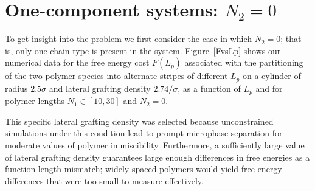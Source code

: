 \section{One-component systems: $N_2 = 0$}\label{sec:nudef}

To get insight into the problem we first consider the case in which $N_2=0$; that is, only one chain type is present in the system. Figure~\ref{FvsLp} shows our numerical data for the free energy cost  $F(L_p)$ associated with the partitioning of the two polymer species into alternate stripes of different $L_p$ on a cylinder of radius $2.5\sigma$ and lateral grafting density $2.74/\sigma$, as a function of $L_p$ and for polymer lengths $N_1 \in \left[10,30\right]$ and $N_2 = 0$.
 
 This specific lateral grafting density was selected because unconstrained simulations under this condition lead to prompt microphase separation for moderate values of polymer immiscibility. Furthermore, a sufficiently large value of lateral grafting density guarantees large enough differences in free energies as a function length mismatch; widely-spaced polymers would yield free energy differences that were too small to measure effectively.
  

